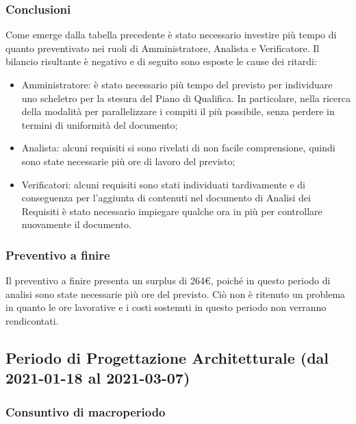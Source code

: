 \subsubsection{Conclusioni}
Come emerge dalla tabella precedente è stato necessario investire più tempo di quanto preventivato
nei ruoli di Amministratore, Analista e Verificatore.
Il bilancio risultante è negativo e di seguito sono esposte le cause dei ritardi:
\begin{itemize}
	\item Amministratore: è stato necessario più tempo del previsto per individuare uno scheletro per la stesura del Piano di Qualifica. In particolare,
	nella ricerca della modalità per parallelizzare i compiti il più possibile, senza perdere in termini di uniformità del documento;
	\item Analista: alcuni requisiti si sono rivelati di non facile comprensione, quindi sono state necessarie 
	più ore di lavoro del previsto;
	\item Verificatori: alcuni requisiti sono stati individuati tardivamente e di conseguenza per
	l’aggiunta di contenuti nel documento di Analisi dei Requisiti è stato necessario impiegare
	qualche ora in più per controllare nuovamente il documento.
\end{itemize}
\subsubsection{Preventivo a finire}
Il preventivo a finire presenta un surplus di 264\euro, poiché in questo periodo di analisi sono state necessarie più ore del previsto.
Ciò non è ritenuto un problema in quanto le ore lavorative e i costi sostenuti in questo periodo non verranno rendicontati.

\subsection{Periodo di Progettazione Architetturale (dal 2021-01-18 al 2021-03-07) }
\subsubsection{Consuntivo di macroperiodo}

